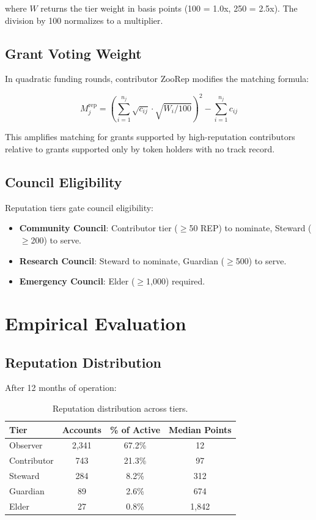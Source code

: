 \documentclass[11pt,letterpaper]{article}
\begin{document}
where $W$ returns the tier weight in basis points (100 = 1.0x, 250 = 2.5x). The division by 100 normalizes to a multiplier.

\subsection{Grant Voting Weight}

In quadratic funding rounds, contributor ZooRep modifies the matching formula:

\begin{equation}
    M_j^{\text{rep}} = \left(\sum_{i=1}^{n_j} \sqrt{c_{ij}} \cdot \sqrt{W_i/100}\right)^2 - \sum_{i=1}^{n_j} c_{ij}
\end{equation}

This amplifies matching for grants supported by high-reputation contributors relative to grants supported only by token holders with no track record.

\subsection{Council Eligibility}

Reputation tiers gate council eligibility:
\begin{itemize}
    \item \textbf{Community Council}: Contributor tier ($\geq$50 REP) to nominate, Steward ($\geq$200) to serve.
    \item \textbf{Research Council}: Steward to nominate, Guardian ($\geq$500) to serve.
    \item \textbf{Emergency Council}: Elder ($\geq$1{,}000) required.
\end{itemize}

\section{Empirical Evaluation}
\label{sec:evaluation}

\subsection{Reputation Distribution}

After 12 months of operation:

\begin{table}[h]
\centering
\caption{Reputation distribution across tiers.}
\label{tab:dist}
\begin{tabular}{lccc}
\toprule
\textbf{Tier} & \textbf{Accounts} & \textbf{\% of Active} & \textbf{Median Points} \\
\midrule
Observer & 2{,}341 & 67.2\% & 12 \\
Contributor & 743 & 21.3\% & 97 \\
Steward & 284 & 8.2\% & 312 \\
Guardian & 89 & 2.6\% & 674 \\
Elder & 27 & 0.8\% & 1{,}842 \\
\bottomrule
\end{tabular}
\end{table}
\end{document}

